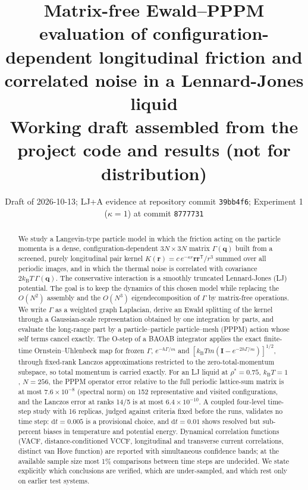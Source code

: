 \documentclass[11pt]{article}
\title{Matrix-free Ewald--PPPM evaluation of configuration-dependent longitudinal friction and correlated noise in a Lennard-Jones liquid\\[4pt]
\large Working draft assembled from the project code and results (not for distribution)}
\author{\todo{author list and affiliations}}
\date{Draft of 2026-10-13; LJ+A evidence at repository commit \texttt{39bb4f6}; Experiment 1 ($\kappa=1$) at commit \texttt{8777731}}
\DeclareRobustCommand{\_}{\textunderscore\allowbreak}
\theoremstyle{remark}
\theoremstyle{definition}
\newcommand{\bq}{\mathbf{q}}
\newcommand{\br}{\mathbf{r}}
\newcommand{\Id}{\mathbf{I}}
\newcommand{\kT}{k_{\mathrm B}T}
\begin{document}
\maketitle

\begin{abstract}
We study a Langevin-type particle model in which the friction acting on the particle momenta is a dense,
configuration-dependent $3N\times 3N$ matrix $\Gamma(\bq)$ built from a screened, purely longitudinal pair kernel
$K(\br)=c\,e^{-\kappa r}\br\br^{\mathsf T}/r^{3}$ summed over all periodic images, and in which the thermal noise is
correlated with covariance $2\kT\,\Gamma(\bq)$. The conservative interaction is a smoothly truncated Lennard-Jones
(LJ) potential. The goal is to keep the dynamics of this chosen model while replacing the $O(N^2)$ assembly and the
$O(N^3)$ eigendecomposition of $\Gamma$ by matrix-free operations. We write $\Gamma$ as a weighted graph Laplacian,
derive an Ewald splitting of the kernel through a Gaussian-scale representation obtained by one integration by
parts, and evaluate the long-range part by a particle--particle particle--mesh (PPPM) action whose self terms cancel
exactly. The O-step of a BAOAB integrator applies the exact finite-time Ornstein--Uhlenbeck map for frozen
$\Gamma$, $e^{-h\Gamma/m}$ and $[\kT m(\Id-e^{-2h\Gamma/m})]^{1/2}$, through fixed-rank Lanczos approximations
restricted to the zero-total-momentum subspace, so total momentum is carried exactly. For an LJ liquid at
$\rho^*=0.75$, $\kT=1$, $N=256$, the PPPM operator error relative to the full periodic lattice-sum matrix is at most
$7.6\times10^{-8}$ (spectral norm) on 152 representative and visited configurations, and the Lanczos error at ranks
14/5 is at most $6.4\times10^{-10}$. A coupled four-level time-step study with 16 replicas, judged against criteria
fixed before the runs, validates no time step: $\mathrm{d}t=0.005$ is a provisional choice, and $\mathrm{d}t=0.01$
shows resolved but sub-percent biases in temperature and potential energy. Dynamical correlation functions (VACF,
distance-conditioned VCCF, longitudinal and transverse current correlations, distinct van Hove function) are reported
with simultaneous confidence bands; at the available sample size most 1\% comparisons between time steps are
undecided. We state explicitly which conclusions are verified, which are under-sampled, and which rest only on
earlier test systems.
\end{abstract}

\tableofcontents

\end{document}
